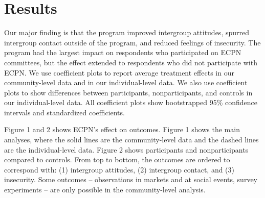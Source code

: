 \documentclass[11pt]{article}
\begin{document}
\hypertarget{results}{%
\section{Results}\label{results}}

Our major finding is that the program improved intergroup attitudes,
spurred intergroup contact outside of the program, and reduced feelings
of insecurity. The program had the largest impact on respondents who
participated on ECPN committees, but the effect extended to respondents
who did not participate with ECPN. We use coefficient plots to report
average treatment effects in our community-level data and in our
individual-level data. We also use coefficient plots to show differences
between participants, nonparticipants, and controls in our
individual-level data. All coefficient plots show bootstrapped 95\%
confidence intervals and standardized coefficients.

Figure 1 and 2 shows ECPN's effect on outcomes. Figure 1 shows the main
analyses, where the solid lines are the community-level data and the
dashed lines are the individual-level data. Figure 2 shows participants
and nonparticipants compared to controls. From top to bottom, the
outcomes are ordered to correspond with: (1) intergroup attitudes, (2)
intergroup contact, and (3) insecurity. Some outcomes -- observations in
markets and at social events, survey experiments -- are only possible in
the community-level analysis.
\end{document}
